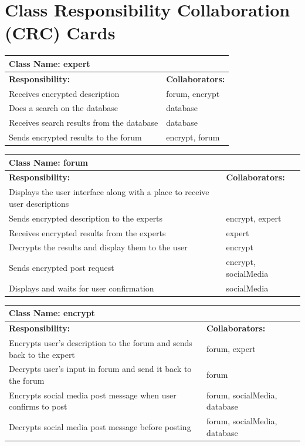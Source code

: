 \documentclass[]{article}
\begin{document}
\section{Class Responsibility Collaboration (CRC) Cards}
\label{sec:class_responsibility_collaboration_crc_cards}
\begin{table}[H]
	\centering
	\begin{tabular}{|p{7cm}|p{7cm}|}
		\hline 
		\multicolumn{2}{|l|}{\textbf{Class Name:} expert} \\
		\hline
		\textbf{Responsibility:} & \textbf{Collaborators:} \\
		\hline
		Receives encrypted description & forum, encrypt \\
		\hline
		Does a search on the database & database \\
		\hline
		Receives search results from the database & database \\
		\hline
		Sends encrypted results to the forum & encrypt, forum \\
		\hline
	\end{tabular}
\end{table}
\begin{table}[H]
	\centering
	\begin{tabular}{|p{7cm}|p{7cm}|}
		\hline 
		\multicolumn{2}{|l|}{\textbf{Class Name:} forum} \\
		\hline
		\textbf{Responsibility:} & \textbf{Collaborators:} \\
		\hline
		Displays the user interface along with a place to receive user descriptions & \\
		\hline
		Sends encrypted description to the experts & encrypt, expert \\
		\hline
		Receives encrypted results from the experts & expert \\
		\hline
		Decrypts the results and display them to the user & encrypt \\
		\hline
		Sends encrypted post request & encrypt, socialMedia \\
		\hline
		Displays and waits for user confirmation & socialMedia \\
		\hline
	\end{tabular}
\end{table}
\begin{table}[H]
	\centering
	\begin{tabular}{|p{7cm}|p{7cm}|}
		\hline 
		\multicolumn{2}{|l|}{\textbf{Class Name:} encrypt} \\
		\hline
		\textbf{Responsibility:} & \textbf{Collaborators:} \\
		\hline
		Encrypts user's description to the forum and sends back to the expert & forum, expert \\
		\hline
		Decrypts user's input in forum and send it back to the forum & forum \\
		\hline
		Encrypts social media post message when user confirms to post & forum, socialMedia, database \\
		\hline
		Decrypts social media post message before posting & forum, socialMedia, database \\
		\hline
	\end{tabular}
\end{table}
\end{document}
